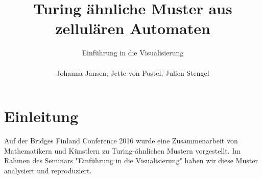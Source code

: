\documentclass[]{article}
\begin{document}
\title{Turing \"ahnliche Muster aus zellul\"aren Automaten}
\author{ Einf\"uhrung in die Visualisierung\\ 
	\\
	Johanna Jansen, Jette von Postel, Julien Stengel\\}
\date{}
\maketitle

\onehalfspacing

\begin{figure}[h]
	\hspace{10pt}
	\hspace{10pt}
	\hspace{10pt}
\end{figure}

\section{Einleitung}

Auf der Bridges Finland Conference 2016 wurde eine Zusammenarbeit von Mathematikern und K\"unstlern zu Turing-\"ahnlichen Mustern vorgestellt. Im Rahmen des Seminars "Einf\"uhrung in die Visualisierung" haben wir diese Muster analysiert und reproduziert. 
\end{document}
